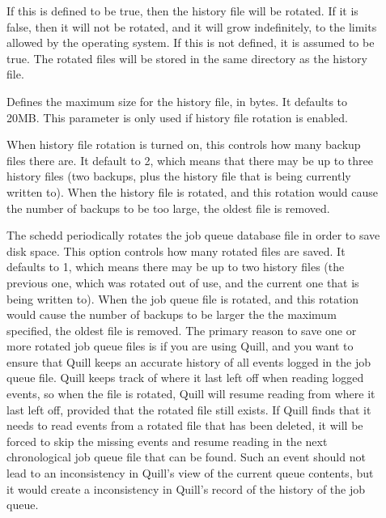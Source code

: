 \begin{description}
\item[] \label{param:EnableHistoryRotation} 
  If this is defined to be true, then the
  history file will be rotated. If it is false, then it will not be
  rotated, and it will grow indefinitely, to the limits allowed by the
  operating system. If this is not defined, it is assumed to be
  true. The rotated files will be stored in the same directory as the
  history file. 

\item[] \label{param:MaxHistoryLog}
  Defines the maximum size for the history file, in bytes. It defaults
  to 20MB. This parameter is only used if history file rotation is
  enabled. 

\item[] \label{param:MaxHistoryRotations}
  When history file rotation is turned on, this controls how many
  backup files there are. It default to 2, which means that there may
  be up to three history files (two backups, plus the history file
  that is being currently written to). When the history file is
  rotated, and this rotation would cause the number of backups to be
  too large, the oldest file is removed. 

\item[]
\label{param:MaxJobQueueLogRotations}
  The schedd periodically rotates the job queue database file in order
  to save disk space.  This option controls how many rotated files are
  saved.  It defaults to 1, which means there may be up to two history
  files (the previous one, which was rotated out of use, and the current one
  that is being written to).  When the job queue file is rotated,
  and this rotation would cause the number of backups to be larger
  the the maximum specified, the oldest file is removed.  The primary
  reason to save one or more rotated job queue files is if you are
  using Quill, and you want to ensure that Quill keeps an accurate history
  of all events logged in the job queue file.  Quill keeps track of where
  it last left off when reading logged events, so when the file is rotated,
  Quill will resume reading from where it last left off, provided that
  the rotated file still exists.  If Quill finds that it needs to read
  events from a rotated file that has been deleted, it will be forced to
  skip the missing events and resume reading in the next chronological job
  queue file that can be found.  Such an event should not lead to
  an inconsistency in Quill's view of the current queue contents, but it
  would create a inconsistency in Quill's record of the history of the
  job queue.


\end{description}
